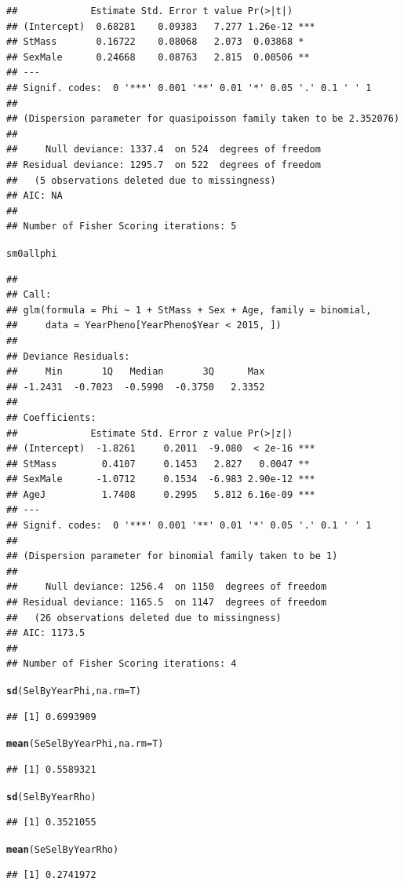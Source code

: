 \documentclass{article}\usepackage[]{graphicx}\usepackage[]{color}
\makeatletter
\newcommand{\hlstd}[1]{\textcolor[rgb]{0.345,0.345,0.345}{#1}}%
\newcommand{\hlkwc}[1]{\textcolor[rgb]{0.333,0.667,0.333}{#1}}%
\newcommand{\hlkwd}[1]{\textcolor[rgb]{0.737,0.353,0.396}{\textbf{#1}}}%
\newenvironment{kframe}{%
 \def\at@end@of@kframe{}%
 \ifinner\ifhmode%
  \def\at@end@of@kframe{\end{minipage}}%
  \begin{minipage}{\columnwidth}%
 \fi\fi%
 \def\FrameCommand##1{\hskip\@totalleftmargin \hskip-\fboxsep
 \colorbox{shadecolor}{##1}\hskip-\fboxsep
     \hskip-\linewidth \hskip-\@totalleftmargin \hskip\columnwidth}%
 \MakeFramed {\advance\hsize-\width
   \@totalleftmargin\z@ \linewidth\hsize
   \@setminipage}}%
 {\par\unskip\endMakeFramed%
 \at@end@of@kframe}
\newenvironment{knitrout}{}{} %
\makeatother
\begin{document}
\begin{knitrout}
\begin{kframe}
\begin{verbatim}
##             Estimate Std. Error t value Pr(>|t|)    
## (Intercept)  0.68281    0.09383   7.277 1.26e-12 ***
## StMass       0.16722    0.08068   2.073  0.03868 *  
## SexMale      0.24668    0.08763   2.815  0.00506 ** 
## ---
## Signif. codes:  0 '***' 0.001 '**' 0.01 '*' 0.05 '.' 0.1 ' ' 1
## 
## (Dispersion parameter for quasipoisson family taken to be 2.352076)
## 
##     Null deviance: 1337.4  on 524  degrees of freedom
## Residual deviance: 1295.7  on 522  degrees of freedom
##   (5 observations deleted due to missingness)
## AIC: NA
## 
## Number of Fisher Scoring iterations: 5
\end{verbatim}
\begin{alltt}
\hlstd{sm0allphi}
\end{alltt}
\begin{verbatim}
## 
## Call:
## glm(formula = Phi ~ 1 + StMass + Sex + Age, family = binomial, 
##     data = YearPheno[YearPheno$Year < 2015, ])
## 
## Deviance Residuals: 
##     Min       1Q   Median       3Q      Max  
## -1.2431  -0.7023  -0.5990  -0.3750   2.3352  
## 
## Coefficients:
##             Estimate Std. Error z value Pr(>|z|)    
## (Intercept)  -1.8261     0.2011  -9.080  < 2e-16 ***
## StMass        0.4107     0.1453   2.827   0.0047 ** 
## SexMale      -1.0712     0.1534  -6.983 2.90e-12 ***
## AgeJ          1.7408     0.2995   5.812 6.16e-09 ***
## ---
## Signif. codes:  0 '***' 0.001 '**' 0.01 '*' 0.05 '.' 0.1 ' ' 1
## 
## (Dispersion parameter for binomial family taken to be 1)
## 
##     Null deviance: 1256.4  on 1150  degrees of freedom
## Residual deviance: 1165.5  on 1147  degrees of freedom
##   (26 observations deleted due to missingness)
## AIC: 1173.5
## 
## Number of Fisher Scoring iterations: 4
\end{verbatim}
\begin{alltt}
\hlkwd{sd}\hlstd{(SelByYearPhi,}\hlkwc{na.rm}\hlstd{=T)}
\end{alltt}
\begin{verbatim}
## [1] 0.6993909
\end{verbatim}
\begin{alltt}
\hlkwd{mean}\hlstd{(SeSelByYearPhi,}\hlkwc{na.rm}\hlstd{=T)}
\end{alltt}
\begin{verbatim}
## [1] 0.5589321
\end{verbatim}
\begin{alltt}
\hlkwd{sd}\hlstd{(SelByYearRho)}
\end{alltt}
\begin{verbatim}
## [1] 0.3521055
\end{verbatim}
\begin{alltt}
\hlkwd{mean}\hlstd{(SeSelByYearRho)}
\end{alltt}
\begin{verbatim}
## [1] 0.2741972
\end{verbatim}
\end{kframe}
\end{knitrout}
\end{document}

